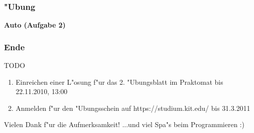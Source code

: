 \documentclass{beamer}
\begin{document}
\begin{frame}
\frametitle{"Ubung}
\begin{center}
\textbf{\Huge Auto (Aufgabe 2)}
\end{center}
\end{frame}


\begin{frame}
\frametitle{Ende}
\begin{block}{TODO}
\begin{enumerate}
\item Einreichen einer L"osung f"ur das 2. "Ubungsblatt im Praktomat bis \alert{22.11.2010, 13:00}
\item Anmelden f"ur den "Ubungsschein auf https://studium.kit.edu/ bis \alert{31.3.2011}
\end{enumerate}
\end{block}

\begin{block}{Vielen Dank f"ur die Aufmerksamkeit!}
...und viel Spa"s beim Programmieren :)
\end{block}
\end{frame}
\end{document}
